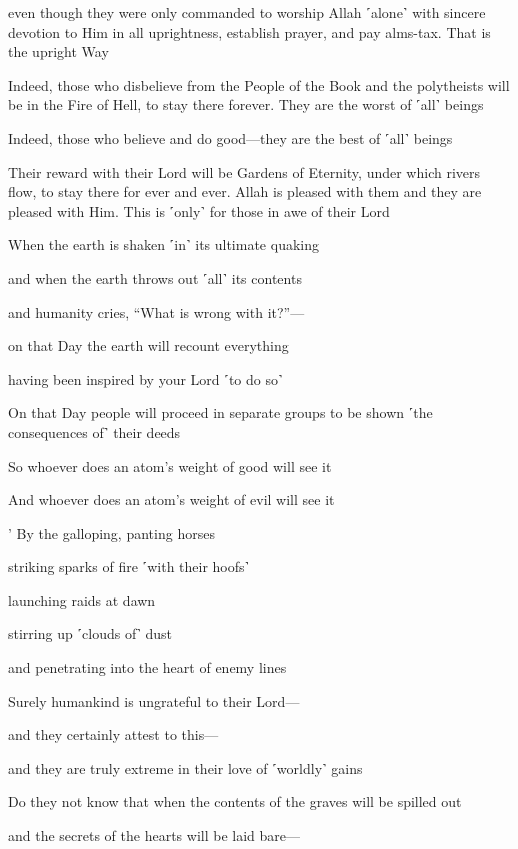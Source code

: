 even though they were only commanded to worship Allah ˹alone˺ with sincere devotion to Him in all uprightness, establish prayer, and pay alms-tax. That is the upright Way

Indeed, those who disbelieve from the People of the Book and the polytheists will be in the Fire of Hell, to stay there forever. They are the worst of ˹all˺ beings

Indeed, those who believe and do good—they are the best of ˹all˺ beings

Their reward with their Lord will be Gardens of Eternity, under which rivers flow, to stay there for ever and ever. Allah is pleased with them and they are pleased with Him. This is ˹only˺ for those in awe of their Lord

When the earth is shaken ˹in˺ its ultimate quaking

and when the earth throws out ˹all˺ its contents

and humanity cries, “What is wrong with it?”—

on that Day the earth will recount everything

having been inspired by your Lord ˹to do so˺

On that Day people will proceed in separate groups to be shown ˹the consequences of˺ their deeds

So whoever does an atom’s weight of good will see it

And whoever does an atom’s weight of evil will see it

’ By the galloping, panting horses

striking sparks of fire ˹with their hoofs˺

launching raids at dawn

stirring up ˹clouds of˺ dust

and penetrating into the heart of enemy lines

Surely humankind is ungrateful to their Lord—

and they certainly attest to this—

and they are truly extreme in their love of ˹worldly˺ gains

Do they not know that when the contents of the graves will be spilled out

and the secrets of the hearts will be laid bare—

